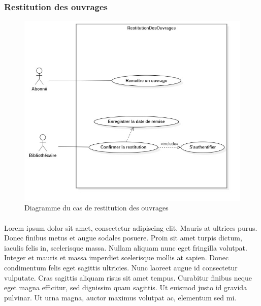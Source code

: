 \subsubsection{Restitution des ouvrages} 
\begin{figure}[h]
        \centering
        \includegraphics[width=1\textwidth]{restitutionDesOuvragesUseCase}
        \caption{Diagramme du cas de restitution des ouvrages}
        \label{image-restitutionDesOuvragesUseCase}
        \end{figure}
\paragraph{}
Lorem ipsum dolor sit amet, consectetur adipiscing elit. Mauris at ultrices purus. Donec finibus metus et augue sodales posuere. Proin sit amet turpis dictum, iaculis felis in, scelerisque massa. Nullam aliquam nunc eget fringilla volutpat. Integer et mauris et massa imperdiet scelerisque mollis at sapien. Donec condimentum felis eget sagittis ultricies. Nunc laoreet augue id consectetur vulputate. Cras sagittis aliquam risus sit amet tempus. Curabitur finibus neque eget magna efficitur, sed dignissim quam sagittis. Ut euismod justo id gravida pulvinar. Ut urna magna, auctor maximus volutpat ac, elementum sed mi.

